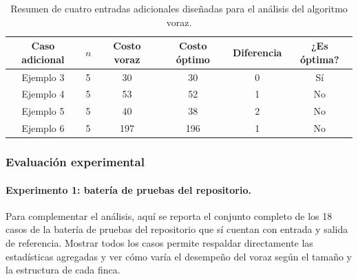 \documentclass[12pt,a4paper]{article}
\begin{document}
\begin{table}[ht]
  \centering
  \small
  \begin{tabular}{cccccc}
    \toprule
    Caso adicional & \(n\) & Costo voraz & Costo \'optimo & Diferencia & ¿Es \'optima? \\
    \midrule
    Ejemplo 3 & 5 & 30 & 30 & 0 & S\'i \\
    Ejemplo 4 & 5 & 53 & 52 & 1 & No \\
    Ejemplo 5 & 5 & 40 & 38 & 2 & No \\
    Ejemplo 6 & 5 & 197 & 196 & 1 & No \\
    \bottomrule
\end{tabular}
  \caption{Resumen de cuatro entradas adicionales dise\~nadas para el an\'alisis del algoritmo voraz.}
\end{table}

\subsubsection{Evaluaci\'on experimental}\label{sec:voraz-evaluacion-experimental}

\paragraph{Experimento 1: bater\'ia de pruebas del repositorio.}
Para complementar el an\'alisis, aqu\'i se reporta el conjunto completo de los 18 casos de la bater\'ia de pruebas del repositorio que s\'i cuentan con entrada y salida de referencia. Mostrar todos los casos permite respaldar directamente las estad\'isticas agregadas y ver c\'omo var\'ia el desempe\~no del voraz seg\'un el tama\~no y la estructura de cada finca.

\medskip
\end{document}
